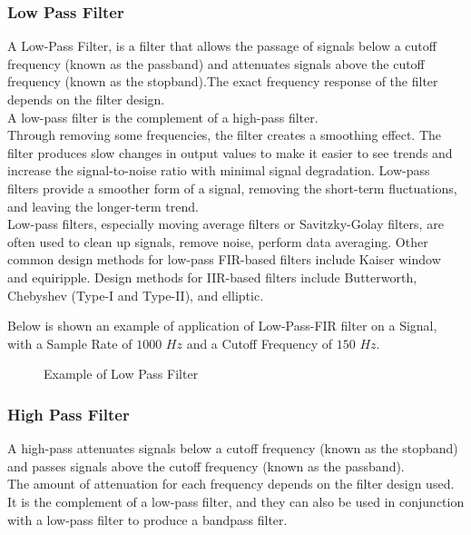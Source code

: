\documentclass[tesi]{subfiles}
\begin{document}
\subsubsection{Low Pass Filter} \label{ssc:Low Pass Filter}
A Low-Pass Filter, is a filter that allows the passage of signals below a cutoff frequency (known as the passband) and attenuates signals above the cutoff frequency (known as the stopband).The exact frequency response of the filter depends on the filter design.\\A low-pass filter is the complement of a high-pass filter.\\
Through removing some frequencies, the filter creates a smoothing effect. The filter produces slow changes in output values to make it easier to see trends and increase the signal-to-noise ratio with minimal signal degradation.
Low-pass filters provide a smoother form of a signal, removing the short-term fluctuations, and leaving the longer-term trend.\\
Low-pass filters, especially moving average filters or Savitzky-Golay filters, are often used to clean up signals, remove noise, perform data averaging.
Other common design methods for low-pass FIR-based filters include Kaiser window and equiripple.  
Design methods for IIR-based filters include Butterworth, Chebyshev (Type-I and Type-II), and elliptic.

\noindent Below is shown an example of application of Low-Pass-FIR filter on a Signal, with a Sample Rate of $1000$ $Hz$ and a Cutoff Frequency of $150$ $Hz$.

 
\begin{figure}[H]	

\label{fig:NoFilter}



 \caption{Example of Low Pass Filter}
  \label{fig:Example of Low Pass Filter.}
\end{figure}

\subsubsection{High Pass Filter} \label{ssc:High Pass Filter}
A high-pass attenuates signals below a cutoff frequency (known as the stopband) and passes signals above the cutoff frequency (known as the passband).\\The amount of attenuation for each frequency depends on the filter design used.  It is the complement of a low-pass filter, and they can also be used in conjunction with a low-pass filter to produce a bandpass filter.\\
\end{document}
